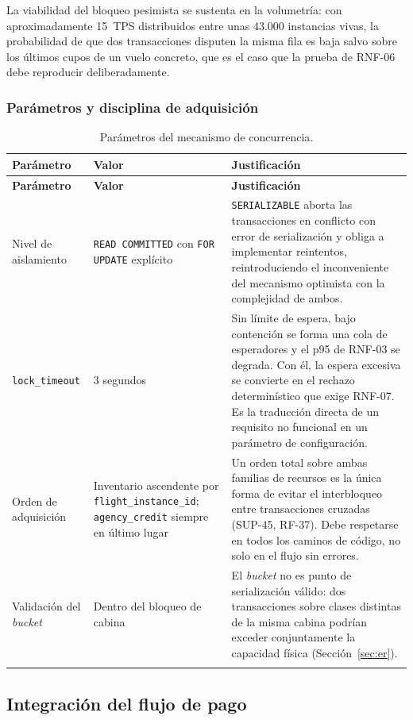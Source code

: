 \documentclass[10pt,letterpaper]{article}
\begin{document}
La viabilidad del bloqueo pesimista se sustenta en la volumetría: con aproximadamente 15~TPS distribuidos entre unas 43.000 instancias vivas, la probabilidad de que dos transacciones disputen la misma fila es baja salvo sobre los últimos cupos de un vuelo concreto, que es el caso que la prueba de RNF-06 debe reproducir deliberadamente.

\subsubsection{Parámetros y disciplina de adquisición}
\begin{longtable}{@{}L{4.0cm} L{4.4cm} L{6.8cm}@{}}
\toprule \textbf{Parámetro} & \textbf{Valor} & \textbf{Justificación} \\ \midrule \endfirsthead
\toprule \textbf{Parámetro} & \textbf{Valor} & \textbf{Justificación} \\ \midrule \endhead
Nivel de aislamiento & \texttt{READ COMMITTED} con \texttt{FOR UPDATE} explícito & \texttt{SERIALIZABLE} aborta las transacciones en conflicto con error de serialización y obliga a implementar reintentos, reintroduciendo el inconveniente del mecanismo optimista con la complejidad de ambos. \\
\texttt{lock\_timeout} & 3 segundos & Sin límite de espera, bajo contención se forma una cola de esperadores y el p95 de RNF-03 se degrada. Con él, la espera excesiva se convierte en el rechazo determinístico que exige RNF-07. Es la traducción directa de un requisito no funcional en un parámetro de configuración. \\
Orden de adquisición & Inventario ascendente por \texttt{flight\_instance\_id}; \texttt{agency\_credit} siempre en último lugar & Un orden total sobre ambas familias de recursos es la única forma de evitar el interbloqueo entre transacciones cruzadas (SUP-45, RF-37). Debe respetarse en todos los caminos de código, no solo en el flujo sin errores. \\
Validación del \emph{bucket} & Dentro del bloqueo de cabina & El \emph{bucket} no es punto de serialización válido: dos transacciones sobre clases distintas de la misma cabina podrían exceder conjuntamente la capacidad física (Sección~\ref{sec:er}). \\
\bottomrule
\caption{Parámetros del mecanismo de concurrencia.}
\end{longtable}

\subsection{Integración del flujo de pago}
\end{document}
